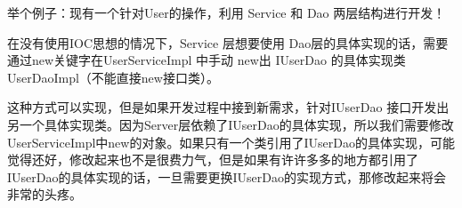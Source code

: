 \documentclass[../../../interview-questions.tex]{subfiles}
\begin{document}
举个例子：现有一个针对User的操作，利用 Service 和 Dao 两层结构进行开发！

在没有使用IOC思想的情况下，Service 层想要使用 Dao层的具体实现的话，需要通过new关键字在UserServiceImpl 中手动 new出 IUserDao 的具体实现类 UserDaoImpl（不能直接new接口类）。

这种方式可以实现，但是如果开发过程中接到新需求，针对IUserDao 接口开发出另一个具体实现类。因为Server层依赖了IUserDao的具体实现，所以我们需要修改UserServiceImpl中new的对象。如果只有一个类引用了IUserDao的具体实现，可能觉得还好，修改起来也不是很费力气，但是如果有许许多多的地方都引用了IUserDao的具体实现的话，一旦需要更换IUserDao的实现方式，那修改起来将会非常的头疼。
\end{document}
